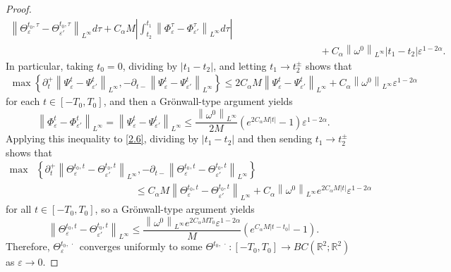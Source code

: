 \documentclass[reqno,centertags,12pt]{amsart}
\theoremstyle{definition}
\numberwithin{equation}{section}
\newcommand{\abs}[1]{\left\lvert#1\right\rvert}
\newcommand{\norm}[1]{\left\|#1\right\|}
\newcommand{\set}[1]{\left\{ #1 \right\}}
\newcommand{\bbR}{{\mathbb{R}}}
\newcommand{\eps}{\varepsilon}
\begin{document}
\begin{proof}
\begin{equation}
\begin{aligned}
{            \norm{\Theta_{\eps}^{t_{0},\tau} - \Theta_{\eps'}^{t_{0},\tau }}_{L^{\infty}}d\tau}
            + C_{\alpha}M\abs{\int_{t_{2}}^{t_{1}}
            \norm{\Phi_{\eps}^{\tau} - \Phi_{\eps'}^{\tau}}_{L^{\infty}}d\tau}
            \\&\quad\quad\quad\quad\quad\quad\quad\quad
            + C_{\alpha}\norm{\omega^{0}}_{L^{\infty}}\abs{t_{1} - t_{2}}\eps^{1-2\alpha}.
        \end{aligned}
    \end{equation}
    In particular, taking $t_{0} = 0$, dividing by $\abs{t_{1} - t_{2}}$,
    and letting $t_{1}\to t_{2}^{\pm}$ shows that
    \begin{align*}
        \max\set{
            \partial_{t}^{+}\norm{\Psi_{\eps}^{t} - \Psi_{\eps'}^{t}}_{L^{\infty}},
            -\partial_{t-}\norm{\Psi_{\eps}^{t} - \Psi_{\eps'}^{t}}_{L^{\infty}}
        }
        \leq 2C_{\alpha}M\norm{\Psi_{\eps}^{t} - \Psi_{\eps'}^{t}}_{L^{\infty}}
        + C_{\alpha}\norm{\omega^{0}}_{L^{\infty}}\eps^{1-2\alpha}
    \end{align*}
    for each $t\in[-T_{0},T_{0}]$, and then a Gr\"{o}nwall-type argument yields
    \[
        \norm{\Phi_{\eps}^{t} - \Phi_{\eps'}^{t}}_{L^{\infty}}
        = \norm{\Psi_{\eps}^{t} - \Psi_{\eps'}^{t}}_{L^{\infty}}
        \leq \frac{\norm{\omega^{0}}_{L^{\infty}}}{2M}
        (e^{2C_{\alpha}M\abs{t}} - 1)\eps^{1-2\alpha}.
    \]
    Applying this inequality to \eqref{2.6}, 
    dividing by $\abs{t_{1} - t_{2}}$ and then sending $t_{1}\to t_{2}^{\pm}$ shows that
    \begin{align*}
       \max & \left\{ \partial_{t}^{+}\norm{\Theta_{\eps}^{t_{0},t} - \Theta_{\eps'}^{t_{0},t}}_{L^{\infty}},
       -\partial_{t-}\norm{\Theta_{\eps}^{t_{0},t} - \Theta_{\eps'}^{t_{0},t}}_{L^{\infty}} \right\}
        \\ & \qquad\qquad\qquad\qquad\qquad \leq C_{\alpha}M\norm{\Theta_{\eps}^{t_{0},t} - \Theta_{\eps'}^{t_{0},t}}_{L^{\infty}}
        + C_{\alpha}\norm{\omega^{0}}_{L^{\infty}}
        e^{2C_{\alpha}M|t|}\eps^{1-2\alpha}
    \end{align*}
    for all $t\in[-T_0,T_0]$,
    so a Gr\"{o}nwall-type argument yields
    \begin{equation*}
        \norm{\Theta_{\eps}^{t_{0},t} - \Theta_{\eps'}^{t_{0},t}}_{L^{\infty}}
        \leq \frac{\norm{\omega^{0}}_{L^{\infty}}e^{2C_{\alpha}MT_{0}}\eps^{1-2\alpha}}{M}
        \left(e^{C_{\alpha}M\abs{t - t_{0}}} - 1\right).
    \end{equation*}
    Therefore, $\Theta_{\eps}^{t_{0},\,\cdot\,}$ converges uniformly
    to some $\Theta^{t_{0},\,\cdot\,}\colon [-T_{0},T_{0}]\to BC(\bbR^{2};\bbR^{2})$
    as $\eps\to 0$. 
    

\end{proof}
\end{document}
